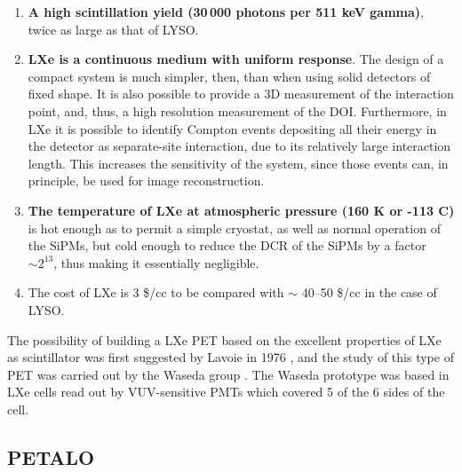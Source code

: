 \documentclass[review]{elsarticle}
\begin{document}
\begin{enumerate}
\item {\bf A high scintillation yield (30\,000 photons per 511 keV gamma)}, twice as large as that of LYSO. 
\item {\bf LXe is a continuous medium with uniform response}. The design of a compact system is much simpler, then, than when using solid detectors of fixed shape. It is also possible to provide a 3D measurement of the interaction point, and, thus, a high resolution measurement of the DOI. Furthermore, in LXe it is possible to identify Compton events depositing all their energy in the detector as separate-site interaction, due to its relatively large interaction length. This increases the sensitivity of the system, since those events can, in principle, be used for image reconstruction. 
\item {\bf The temperature of LXe at atmospheric pressure (160 K or -113 C)} is hot enough as to permit a simple cryostat, as well as normal operation of the SiPMs, but cold enough to reduce the DCR of the SiPMs by a factor $\sim 2^{13}$, thus making it essentially negligible. 
\item {The cost} of LXe is 3 \$/cc to be compared with $\sim$ 40--50 \$/cc in the case of LYSO. 
 \end{enumerate}

The possibility of building a LXe PET based on the excellent properties of LXe as scintillator was first suggested by Lavoie in 1976 \cite{lavoie}, and the study of this type of PET was carried out by the Waseda group \cite{Doke1,Nishikido2,Nishikido1}. The Waseda prototype was based in LXe cells read out by VUV-sensitive PMTs which covered 5 of the 6 sides of the cell. 

\subsection*{PETALO}
\end{document}
